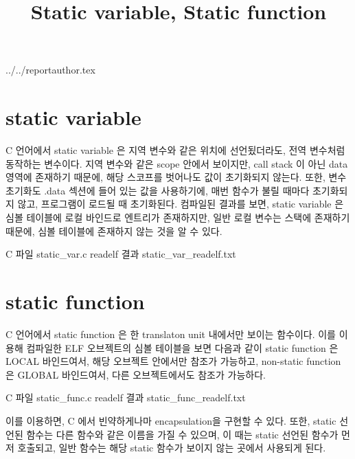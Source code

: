 \documentclass {article}
\begin{document}
\title {Static variable, Static function}
 {../../reportauthor.tex}
\maketitle

\section {static variable}
C 언어에서 static variable 은 지역 변수와 같은 위치에 선언됬더라도, 전역 변수처럼 동작하는 변수이다.
지역 변수와 같은 scope 안에서 보이지만, call stack 이 아닌 data 영역에 존재하기 때문에, 해당 스코프를 벗어나도 값이 초기화되지 않는다. 또한, 변수 초기화도 .data 섹션에 들어 있는 값을 사용하기에, 매번 함수가 불릴 때마다 초기화되지 않고, 프로그램이 로드될 때 초기화된다.
컴파일된 결과를 보면, static variable 은 심볼 테이블에 로컬 바인드로 엔트리가 존재하지만, 일반 로컬 변수는 스택에 존재하기 때문에, 심볼 테이블에 존재하지 않는 것을 알 수 있다.

C 파일
{static_var.c}
readelf 결과
{static_var_readelf.txt}

\section {static function}
C 언어에서 static function 은 한 translaton unit 내에서만 보이는 함수이다. 이를 이용해 컴파일한 ELF 오브젝트의 심볼 테이블을 보면 다음과 같이 static function 은 LOCAL 바인드여서, 해당 오브젝트 안에서만 참조가 가능하고, non-static function 은 GLOBAL 바인드여서, 다른 오브젝트에서도 참조가 가능하다.

C 파일
{static_func.c}
readelf 결과
{static_func_readelf.txt}

이를 이용하면, C 에서 빈약하게나마 encapsulation을 구현할 수 있다. 
또한, static 선언된 함수는 다른 함수와 같은 이름을 가질 수 있으며, 이 때는 static 선언된 함수가 먼저 호출되고, 일반 함수는 해당 static 함수가 보이지 않는 곳에서 사용되게 된다.
\end{document}
